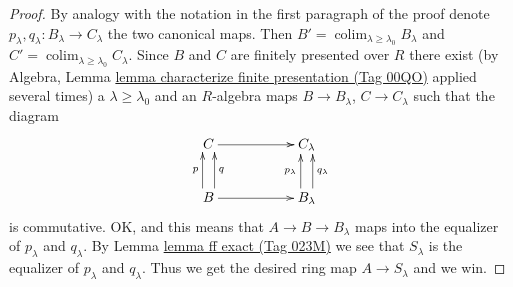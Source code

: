 \documentclass{amsart}
\theoremstyle{plain}
\theoremstyle{definition}
\theoremstyle{remark}
\numberwithin{equation}{subsection}
\def\colim{\mathop{\mathrm{colim}}\nolimits}
\begin{document}
\begin{proof}
\medskip\noindent
By analogy with the notation in the first paragraph of the proof denote
$p_\lambda, q_\lambda : B_\lambda \to C_\lambda$ the two canonical maps.
Then $B' = \colim_{\lambda \geq \lambda_0} B_\lambda$
and $C' = \colim_{\lambda \geq \lambda_0} C_\lambda$.
Since $B$ and $C$ are finitely presented over $R$ there exist
(by Algebra, Lemma \href{https://stacks.math.columbia.edu/tag/00QO}{lemma characterize finite presentation (Tag 00QO)}
applied several times)
a $\lambda \geq \lambda_0$ and an $R$-algebra maps
$B \to B_\lambda$, $C \to C_\lambda$ such that
the diagram
$$
\xymatrix{
C \ar[rr] & &
C_\lambda \\
B \ar[rr]
\ar@<1ex>[u]^-p
\ar@<-1ex>[u]_-q
& &
B_\lambda
\ar@<1ex>[u]^-{p_\lambda}
\ar@<-1ex>[u]_-{q_\lambda}
}
$$
is commutative. OK, and this means that $A \to B \to B_\lambda$
maps into the equalizer of $p_\lambda$ and $q_\lambda$.
By Lemma \href{https://stacks.math.columbia.edu/tag/023M}{lemma ff exact (Tag 023M)} we
see that $S_\lambda$ is the equalizer of $p_\lambda$ and $q_\lambda$.
Thus we get the desired ring map $A \to S_\lambda$ and we win.
\end{proof}
\end{document}
